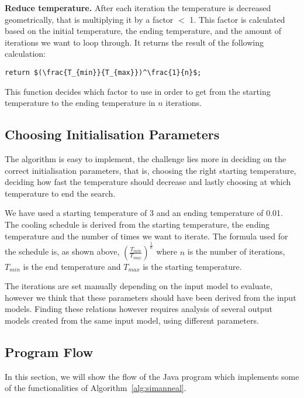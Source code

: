 \documentclass[a4paper]{article}
\begin{document}
\begin{description}
\item{\textbf{Reduce temperature.}}
After each iteration the temperature is decreased geometrically, that is multiplying it by a factor $<$ 1.
This factor is calculated based on the initial temperature, the ending temperature, and the amount of iterations we want to loop through.
It returns the result of the following calculation:

\begin{lstlisting}[mathescape=true]
	return $(\frac{T_{min}}{T_{max}})^\frac{1}{n}$;
\end{lstlisting}

This function decides which factor to use in order to get from the starting temperature to the ending temperature in $n$ iterations.

\end{description}

\subsection{Choosing Initialisation Parameters}

The algorithm is easy to implement, the challenge lies more in deciding on the correct initialisation parameters, 
that is, choosing the right starting temperature, deciding how fast the temperature should decrease and lastly choosing at which temperature to end the search.

We have used a starting temperature of 3 and an ending temperature of 0.01.
The cooling schedule is derived from the starting temperature, the ending temperature and the number of times we want to iterate.
The formula used for the schedule is, as shown above,  $(\frac{T_{min}}{T_{max}})^\frac{1}{n}$ where $n$ is the number of iterations, $T_{min}$ is the end temperature and $T_{max}$ is the starting temperature.

The iterations are set manually depending on the input model to evaluate, however we think that these parameters should have been derived from the input models.
Finding these relations however requires analysis of several output models created from the same input model, using different parameters.


\subsection{Program Flow}\label{sec:program_flow}

In this section, we will show the flow of the Java program which implements some of the functionalities of Algorithm~\ref{alg:simanneal}.
\end{document}
